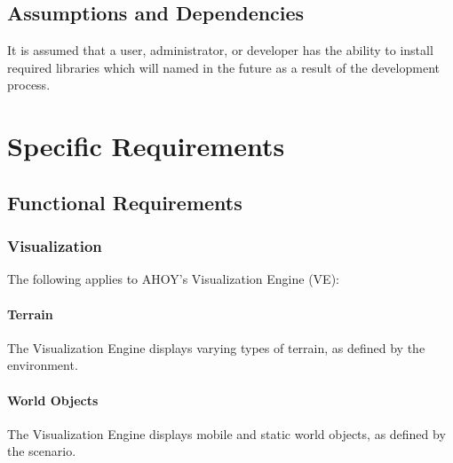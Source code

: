 \documentclass[titlepage]{article}
\begin{document}
\subsection{Assumptions and Dependencies%
  \label{assumptions-and-dependencies}%
}

It is assumed that a user, administrator, or developer has the ability to install required libraries which will named in the future as a result of the development process.


\section{Specific Requirements%
  \label{specific-requirements}%
}

\subsection{Functional Requirements%
    \label{functional}%
}



\subsubsection{Visualization}
The following applies to AHOY's Visualization Engine (VE):
    \paragraph{Terrain} The Visualization Engine displays varying types of terrain, as defined by the environment.
    \paragraph{World Objects} The Visualization Engine displays mobile and static world objects, as defined by the scenario.
\end{document}
